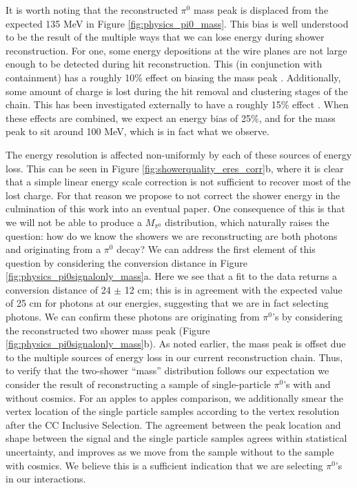 \par It is worth noting that the reconstructed $\pi^0$ mass peak is displaced from the expected 135 MeV in Figure \ref{fig:physics_pi0_mass}. This bias is well understood to be the result of the multiple ways that we can lose energy during shower reconstruction. For one, some energy depositions at the wire planes are not large enough to be detected during hit reconstruction. This (in conjunction with containment) has a roughly 10\% effect on biasing the mass peak \cite{bib:davidc_hitthresholding}. Additionally, some amount of charge is lost during the hit removal and clustering stages of the chain.  This has been investigated externally to have a roughly 15\% effect \cite{bib:davidc_missingE}. When these effects are combined, we expect an energy bias of 25\%, and for the mass peak to sit around 100 MeV, which is in fact what we observe. 
\par The energy resolution is affected non-uniformly by each of these sources of energy loss. This can be seen in Figure \ref{fig:showerquality_eres_corr}b, where it is clear that a simple linear energy scale correction is not sufficient to recover most of the lost charge. For that reason we propose to not correct the shower energy in the culmination of this work into an eventual paper. One consequence of this is that we will not be able to produce a $M_{\pi^0}$ distribution, which naturally raises the question: how do we know the showers we are reconstructing are both photons and originating from a $\pi^0$ decay? We can address the first element of this question by considering the conversion distance in Figure \ref{fig:physics_pi0signalonly_mass}a.  Here we see that a fit to the data returns a conversion distance of 24 $\pm$ 12 cm; this is in agreement with the expected value of 25 cm for photons at our energies, suggesting that we are in fact selecting photons. We can confirm these photons are originating from $\pi^0$'s by considering the reconstructed two shower mass peak (Figure \ref{fig:physics_pi0signalonly_mass}b).  As noted earlier, the mass peak is offset due to the multiple sources of energy loss in our current reconstruction chain. Thus, to verify that the two-shower “mass” distribution follows our expectation we consider the result of reconstructing a sample of single-particle $\pi^0$’s with and without cosmics. For an apples to apples comparison, we additionally smear the vertex location of the single particle samples according to the vertex resolution after the CC Inclusive Selection.  The agreement between the peak location and shape between the signal and the single particle samples agrees within statistical uncertainty, and improves as we move from the sample without to the sample with cosmics. We believe this is a sufficient indication that we are selecting $\pi^0$'s in our interactions. 


